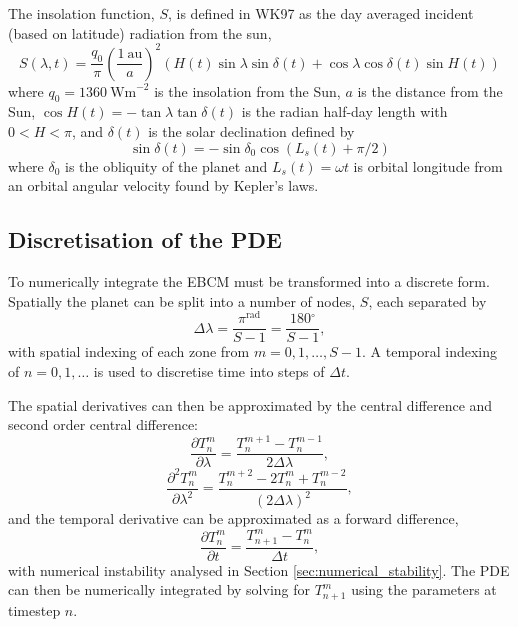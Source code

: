 \documentclass[12pt, onecolumn]{revtex4-2}    %
\newcommand{\radians}{\ensuremath{^{\text{rad}}}}
\newcommand{\degrees}{\ensuremath{^{\circ}}}
\begin{document}
The insolation function, $S$, is defined in WK97 as the day averaged incident (based on latitude) radiation from the sun,
$$
    S(\lambda, t) = \frac{q_0}{\pi} \left(\frac{1 \ \text{au}}{a}\right)^2 (H(t) \sin{\lambda} \sin{\delta(t)} + \cos{\lambda} \cos{\delta(t)} \sin{H(t)})
$$
where $q_0=1360 \ \text{Wm}^{-2}$ is the insolation from the Sun,
$a$ is the distance from the Sun,
$\cos H(t) = -\tan \lambda \tan \delta(t)$ is the radian half-day length with $0 < H < \pi$,
and $\delta(t)$ is the solar declination defined by
$$
    \sin \delta(t) = -\sin \delta_0 \cos(L_s(t) + \pi/2)
$$
where $\delta_0$ is the obliquity of the planet and $L_s(t) = \omega t$ is orbital longitude from an orbital angular velocity found by Kepler's laws.

\subsection{Discretisation of the PDE} \label{ssec:solve_PDE}

To numerically integrate the EBCM must be transformed into a discrete form. Spatially the planet can be split into a number of nodes, $S$, each separated by
\begin{equation*}
    \Delta\lambda = \frac{\pi\radians}{S - 1} = \frac{180\degrees}{S - 1},
\end{equation*}
with spatial indexing of each zone from $m=0, 1, \dots, S-1$.
A temporal indexing of $n=0,1,\dots$ is used to discretise time into steps of $\Delta t$.

The spatial derivatives can then be approximated by the central difference and second order central difference:
\begin{equation} \label{eq:space_1}
    \frac{\partial T^m_n}{\partial \lambda} = \frac{T^{m+1}_n - T^{m-1}_n}{2 \Delta\lambda},
\end{equation}
\begin{equation} \label{eq:space_2}
    \frac{\partial^2T^m_n}{\partial \lambda^2} = \frac{T^{m+2}_n -2T^m_n + T^{m-2}_n}{(2 \Delta\lambda)^2},
\end{equation}
and the temporal derivative can be approximated as a forward difference,
\begin{equation} \label{eq:time_1}
    \frac{\partial T^m_n}{\partial t} = \frac{T^m_{n+1} - T^m_n}{\Delta t},
\end{equation}
with numerical instability analysed in Section \ref{sec:numerical_stability}.
The PDE can then be numerically integrated by solving for $T^{m}_{n+1}$ using the parameters at timestep $n$.
\end{document}

